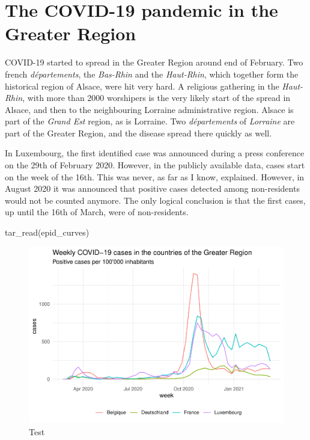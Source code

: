 \documentclass{article}
\newenvironment{Shaded}{\begin{snugshade}}{\end{snugshade}}
\newcommand{\FunctionTok}[1]{\textcolor[rgb]{0.00,0.00,0.00}{#1}}
\newcommand{\NormalTok}[1]{#1}
\begin{document}
\hypertarget{the-covid-19-pandemic-in-the-greater-region}{%
\section{The COVID-19 pandemic in the Greater
Region}\label{the-covid-19-pandemic-in-the-greater-region}}

COVID-19 started to spread in the Greater Region around end of February.
Two french \emph{départements}, the \emph{Bas-Rhin} and the
\emph{Haut-Rhin}, which together form the historical region of Alsace,
were hit very hard. A religious gathering in the \emph{Haut-Rhin}, with
more than 2000 worshipers is the very likely start of the spread in
Alsace, and then to the neighbouring Lorraine administrative region.
Alsace is part of the \emph{Grand Est} region, as is Lorraine. Two
\emph{départements} of \emph{Lorraine} are part of the Greater Region,
and the disease spread there quickly as well.

In Luxembourg, the first identified case was announced during a press
conference on the 29th of February 2020. However, in the publicly
available data, cases start on the week of the 16th. This was never, as
far as I know, explained. However, in August 2020 it was announced that
positive cases detected among non-residents would not be counted
anymore. The only logical conclusion is that the first cases, up until
the 16th of March, were of non-residents.

\begin{Shaded}
\begin{Highlighting}[]
\FunctionTok{tar\_read}\NormalTok{(epid\_curves)}
\end{Highlighting}
\end{Shaded}

\begin{figure}
\centering
\includegraphics{paper_files/figure-latex/epid_curves-1.pdf}
\caption{Test}
\end{figure}
\end{document}
